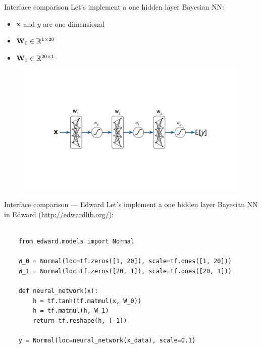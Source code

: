 \documentclass[lualatex, aspectratio=169]{beamer}
\begin{document}
\begin{frame}{Interface comparison}
  Let's implement a one hidden layer Bayesian NN:
  \begin{itemize}
    \item $\mathbf{x}$ and $y$ are one dimensional
    \item $\mathbf{W}_0 \in \mathbb{R}^{1 \times 20}$
    \item $\mathbf{W}_1 \in \mathbb{R}^{20 \times 1}$
  \end{itemize}
    \begin{figure}
      \includegraphics[page=5, trim={3cm 4.5cm 10cm 4.5cm}, clip, width=0.6\pagewidth]{assets/pictures.pdf}
    \end{figure}
\end{frame}


\begin{frame}[fragile]{Interface comparison --- Edward}
  Let's implement a one hidden layer Bayesian NN in Edward (\url{http://edwardlib.org/}):
  
  \begin{verbatim}

    from edward.models import Normal

    W_0 = Normal(loc=tf.zeros([1, 20]), scale=tf.ones([1, 20]))
    W_1 = Normal(loc=tf.zeros([20, 1]), scale=tf.ones([20, 1]))

    def neural_network(x):
        h = tf.tanh(tf.matmul(x, W_0))
        h = tf.matmul(h, W_1)
        return tf.reshape(h, [-1])

    y = Normal(loc=neural_network(x_data), scale=0.1)

  \end{verbatim}
\end{frame}
\end{document}
